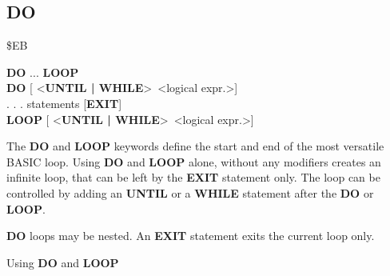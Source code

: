 
\newpage
\subsection{DO}
\begin{description}[leftmargin=3cm,style=nextline]
\item [Token:] \$EB
\item [Format:] {\bf DO} ... {\bf LOOP} \\
                {\bf DO} [ <{\bf UNTIL | WHILE}> <logical expr.>] \\
                . . . statements [{\bf EXIT}] \\
                {\bf LOOP} [ <{\bf UNTIL | WHILE}> <logical expr.>]
\item [Usage:] The {\bf DO} and {\bf LOOP} keywords define
               the start and end of the most versatile BASIC loop.
               Using {\bf DO} and {\bf LOOP} alone, without any
               modifiers creates an infinite loop, that can be left
               by the {\bf EXIT} statement only. The loop can be
               controlled by adding an {\bf UNTIL} or a {\bf WHILE}
               statement after the {\bf DO} or {\bf LOOP}.

\item [Remarks:] {\bf DO} loops may be nested. An {\bf EXIT} statement
               exits the current loop only.
\item [Example:] Using {\bf DO} and {\bf LOOP}
\end{description}


\newpage
